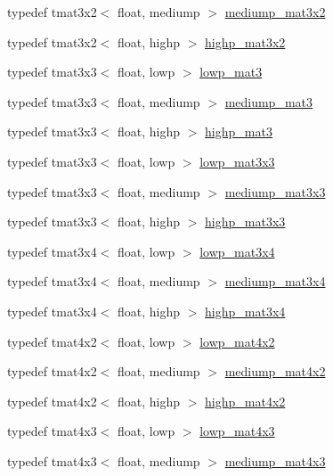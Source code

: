\begin{DoxyCompactItemize}
\item 
typedef tmat3x2$<$ float, mediump $>$ \hyperlink{namespaceglm_a12af91dfb7d3e26a5d69ca855b3f575f}{mediump\+\_\+mat3x2}
\item 
typedef tmat3x2$<$ float, highp $>$ \hyperlink{namespaceglm_aff6a70f319061d2986f1f1db60266a44}{highp\+\_\+mat3x2}
\item 
typedef tmat3x3$<$ float, lowp $>$ \hyperlink{namespaceglm_aa444aaad071ddcf85b8c490b143e9957}{lowp\+\_\+mat3}
\item 
typedef tmat3x3$<$ float, mediump $>$ \hyperlink{namespaceglm_a41f782980f05801931ed7ae6f568275a}{mediump\+\_\+mat3}
\item 
typedef tmat3x3$<$ float, highp $>$ \hyperlink{namespaceglm_a9d182882c10433f84c024b13e1ee1557}{highp\+\_\+mat3}
\item 
typedef tmat3x3$<$ float, lowp $>$ \hyperlink{namespaceglm_a99ebdf85c702b7f41006d25808798769}{lowp\+\_\+mat3x3}
\item 
typedef tmat3x3$<$ float, mediump $>$ \hyperlink{namespaceglm_a70f5a956774bf9e5dd2b9ce0ead37d59}{mediump\+\_\+mat3x3}
\item 
typedef tmat3x3$<$ float, highp $>$ \hyperlink{namespaceglm_a3ec83a2457d609215bc7a2885d29e255}{highp\+\_\+mat3x3}
\item 
typedef tmat3x4$<$ float, lowp $>$ \hyperlink{namespaceglm_a330f1d9a226fb5640c67e3ec9d485dc0}{lowp\+\_\+mat3x4}
\item 
typedef tmat3x4$<$ float, mediump $>$ \hyperlink{namespaceglm_a9fb2492cd6d05a3f7c8fad76eacd8bcf}{mediump\+\_\+mat3x4}
\item 
typedef tmat3x4$<$ float, highp $>$ \hyperlink{namespaceglm_a15ccad88b491604648fd620a936eac93}{highp\+\_\+mat3x4}
\item 
typedef tmat4x2$<$ float, lowp $>$ \hyperlink{namespaceglm_aac6a972e9b35c84ca15676827cd2d5e3}{lowp\+\_\+mat4x2}
\item 
typedef tmat4x2$<$ float, mediump $>$ \hyperlink{namespaceglm_a9e874a0ff9902e20096455fe72f494f5}{mediump\+\_\+mat4x2}
\item 
typedef tmat4x2$<$ float, highp $>$ \hyperlink{namespaceglm_afe542544ee5c889f144684842f840e43}{highp\+\_\+mat4x2}
\item 
typedef tmat4x3$<$ float, lowp $>$ \hyperlink{namespaceglm_ac228d98de7baadab88ca5d9c72e8cc95}{lowp\+\_\+mat4x3}
\item 
typedef tmat4x3$<$ float, mediump $>$ \hyperlink{namespaceglm_a25249273959c0b7c96e981ffdcd17dde}{mediump\+\_\+mat4x3}
\item 

\end{DoxyCompactItemize}
